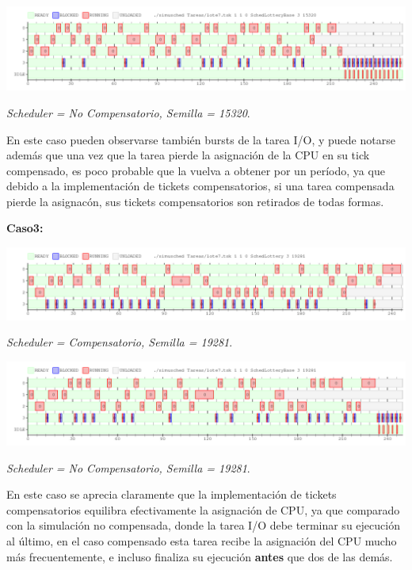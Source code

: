 \includegraphics[width=1\textwidth]{./Graficos/Ej10v2/Task7/ej9_2_base.png}
\begin{center}
 \textit{Scheduler = No Compensatorio, Semilla = 15320}.
\end{center}

En este caso pueden observarse tambi\'en bursts de la tarea I/O, y puede notarse adem\'as que una vez que la tarea pierde la asignaci\'on de la CPU en su tick compensado, es poco probable que la vuelva a obtener por un per\'iodo, ya que debido a la implementaci\'on de tickets compensatorios, si una tarea compensada pierde la asignac\'on, sus tickets compensatorios son retirados de todas formas.

\vspace{2mm}
\textbf{Caso3:}


\includegraphics[width=1\textwidth]{./Graficos/Ej10v2/Task7/ej9_3.png}
\begin{center}
 \textit{Scheduler = Compensatorio, Semilla = 19281}.
\end{center}


\includegraphics[width=1\textwidth]{./Graficos/Ej10v2/Task7/ej9_3_base.png}
\begin{center}
 \textit{Scheduler = No Compensatorio, Semilla = 19281}.
\end{center}

En este caso se aprecia claramente que la implementaci\'on de tickets compensatorios equilibra efectivamente la asignaci\'on de CPU, ya que comparado con la simulaci\'on no compensada, donde la tarea I/O debe terminar su ejecuci\'on al \'ultimo, en el caso compensado esta tarea recibe la asignaci\'on del CPU mucho m\'as frecuentemente, e incluso finaliza su ejecuci\'on \textbf{antes} que dos de las dem\'as.

